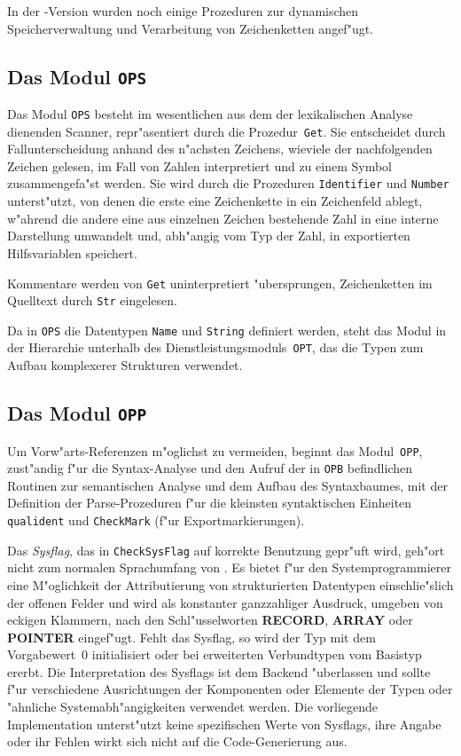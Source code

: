 In der \modula-Version wurden noch einige Prozeduren zur dynamischen Speicherverwaltung
und Verarbeitung von Zeichenketten angef"ugt.

\subsection{Das Modul {\tt OPS}}

Das Modul {\tt OPS} besteht im wesentlichen aus dem der lexikalischen Analyse dienenden
Scanner, repr"asentiert durch die Prozedur~{\tt Get}.
Sie entscheidet durch Fallunterscheidung anhand des n"achsten Zeichens, wieviele
der nachfolgenden Zeichen gelesen, im Fall von Zahlen interpretiert und zu einem Symbol
zusammengefa"st werden.
Sie wird durch die Prozeduren {\tt Identifier} und {\tt Number} unterst"utzt,
von denen die erste eine Zeichenkette in ein Zeichenfeld ablegt, w"ahrend die andere eine
aus einzelnen Zeichen bestehende Zahl in eine interne Darstellung umwandelt und,
abh"angig vom Typ der Zahl, in exportierten Hilfsvariablen speichert.

Kommentare werden von {\tt Get} uninterpretiert "ubersprungen, Zeichenketten
im Quelltext durch {\tt Str} eingelesen.

Da in {\tt OPS} die Datentypen {\tt Name} und {\tt String} definiert werden,
steht das Modul in der Hierarchie unterhalb des Dienstleistungsmoduls~{\tt OPT},
das die Typen zum Aufbau komplexerer Strukturen verwendet.

\subsection{Das Modul {\tt OPP}}
\label{OPP}

Um Vorw"arts-Referenzen m"oglichst zu vermeiden, beginnt das Modul~{\tt OPP},
zust"andig f"ur die Syntax-Analyse und den Aufruf der in {\tt OPB}
befindlichen Routinen zur semantischen Analyse und dem Aufbau des Syntaxbaumes,
mit der Definition der Parse-Prozeduren f"ur die kleinsten syntaktischen
Einheiten {\tt qualident} und {\tt CheckMark} (f"ur Exportmarkierungen).

Das {\em Sysflag}, das in {\tt CheckSysFlag} auf korrekte Benutzung
gepr"uft wird, geh"ort nicht zum normalen Sprachumfang von \oberon.
Es bietet f"ur den Systemprogrammierer eine M"oglichkeit der Attributierung
von strukturierten Datentypen einschlie"slich der offenen Felder und wird
als konstanter ganzzahliger Ausdruck, umgeben von eckigen Klammern, nach den Schl"usselworten
{\bf RECORD}, {\bf ARRAY} oder {\bf POINTER} eingef"ugt.
Fehlt das Sysflag, so wird der Typ mit dem Vorgabewert~0 initialisiert oder
bei erweiterten Verbundtypen vom Basistyp ererbt.
Die Interpretation des Sysflags ist dem Backend "uberlassen und sollte f"ur
verschiedene Ausrichtungen der Komponenten oder Elemente der Typen oder
"ahnliche Systemabh"angigkeiten verwendet werden.
Die vorliegende Implementation unterst"utzt keine spezifischen Werte von Sysflags,
ihre Angabe oder ihr Fehlen wirkt sich nicht auf die Code-Generierung aus.

